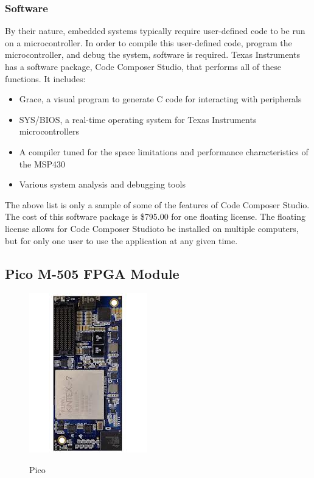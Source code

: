 \documentclass[12pt]{article}
\begin{document}
\subsubsection{Software}
By their nature, embedded systems typically require user-defined code to be run on a microcontroller. In order to compile this user-defined code, program the microcontroller, and debug the system, software is required. Texas Instruments has a software package, Code Composer Studio\texttrademark, that performs all of these functions. It includes: 
\begin{itemize}
  \item Grace\texttrademark, a visual program to generate C code for interacting with peripherals
  \item SYS/BIOS, a real-time operating system for Texas Instruments microcontrollers
  \item A compiler tuned for the space limitations and performance characteristics of the MSP430
  \item Various system analysis and debugging tools
\end{itemize}
The above list is only a sample of some of the features of Code Composer Studio. The cost of this software package is \$795.00 for one floating license. The floating license allows for Code Composer Studio\texttrademark to be installed on multiple computers, but for only one user to use the application at any given time.

\subsection{Pico M-505 FPGA Module}
\begin{figure}[h!]
  \centering
  \includegraphics[scale=.5]{images/pico}
  \label{img:pico}
  \caption{Pico}
\end{figure}
\end{document}
